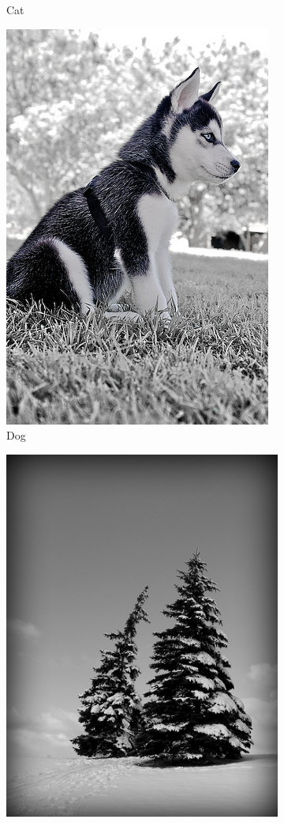 \documentclass[conference]{IEEEtran}
\begin{document}
\begin{spacing}{0.9}
\begin{figure}
\begin{subfigure}{.15\textwidth}
  \caption{Cat}
\end{subfigure}%
\begin{subfigure}{.15\textwidth}
  \centering
  \includegraphics[scale=0.1]{classTypeExample3.jpg}
  \caption{Dog}
\end{subfigure}%
\begin{subfigure}{.15\textwidth}
  \centering
  \includegraphics[scale=0.1]{classTypeExample4.jpg}

\end{subfigure}
\end{figure}
\end{spacing}
\end{document}
